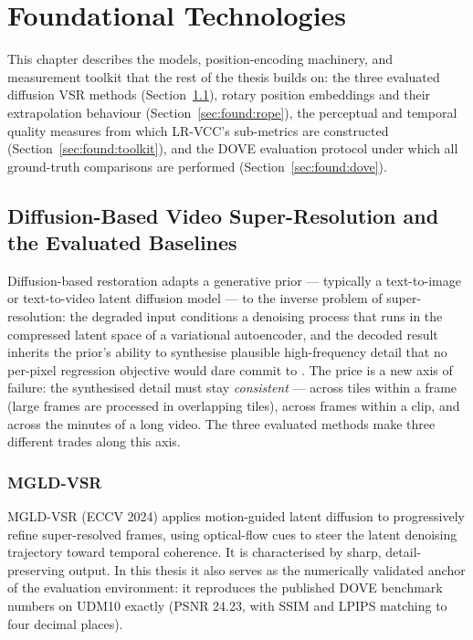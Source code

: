 \chapter{Foundational Technologies}
\label{ch:foundations}

This chapter describes the models, position-encoding machinery, and measurement toolkit
that the rest of the thesis builds on: the three evaluated diffusion VSR methods
(Section~\ref{sec:found:vsr}), rotary position embeddings and their extrapolation
behaviour (Section~\ref{sec:found:rope}), the perceptual and temporal quality measures
from which LR-VCC's sub-metrics are constructed (Section~\ref{sec:found:toolkit}), and
the DOVE evaluation protocol under which all ground-truth comparisons are performed
(Section~\ref{sec:found:dove}).

\section{Diffusion-Based Video Super-Resolution and the Evaluated Baselines}
\label{sec:found:vsr}

Diffusion-based restoration adapts a generative prior --- typically a
text-to-image or text-to-video latent diffusion model --- to the inverse
problem of super-resolution: the degraded input conditions a denoising process
that runs in the compressed latent space of a variational autoencoder, and the
decoded result inherits the prior's ability to synthesise plausible
high-frequency detail that no per-pixel regression objective would dare commit
to \cite{wang_stablesr_2024}. The price is a new axis of failure: the
synthesised detail must stay \emph{consistent} --- across tiles within a frame
(large frames are processed in overlapping tiles), across frames within a clip,
and across the minutes of a long video. The three evaluated methods make three
different trades along this axis.

\subsection{MGLD-VSR}
MGLD-VSR \cite{he_mgld_2024} (ECCV 2024) applies motion-guided latent diffusion to
progressively refine super-resolved frames, using optical-flow cues to steer the latent
denoising trajectory toward temporal coherence. It is characterised by sharp,
detail-preserving output. In this thesis it also serves as the numerically validated
anchor of the evaluation environment: it reproduces the published DOVE benchmark numbers
on UDM10 exactly (PSNR 24.23, with SSIM and LPIPS matching to four decimal places).

